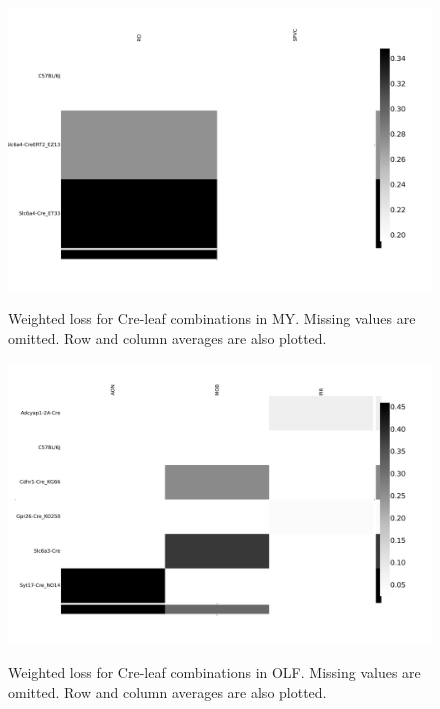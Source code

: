\begin{figure}[H]
    \centering
    \includegraphics[width = 7in]{figs/lossdetails_354.png} 
    \label{fig:distances}
    \caption{Weighted loss for Cre-leaf combinations in MY. Missing values are omitted.   Row and column averages are also plotted.}
\end{figure}

\begin{figure}[H]
    \centering
    \includegraphics[width = 7in]{figs/lossdetails_698.png} 
    \label{fig:distances}
    \caption{Weighted loss for Cre-leaf combinations in OLF.  Missing values are omitted.   Row and column averages are also plotted.}
\end{figure}

